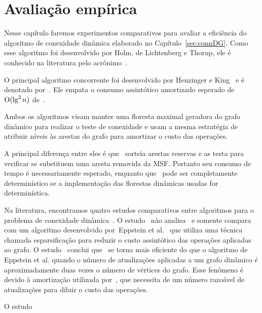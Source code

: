 \chapter{Avaliação empírica}
\label{sec:avaliacao-empirica}

Nesse capítulo faremos experimentos comparativos para avaliar a eficiência do algoritmo de conexidade dinâmica elaborado no Capítulo~\ref{sec:connDG}. Como esse algoritmo foi desenvolvido  por Holm, de Lichtenberg e Thorup, ele é conhecido na literatura pelo acrônimo~\HDT.

O principal algoritmo concorrente foi desenvolvido por Henzinger e King~\cite{HenzingerKing} e é denotado por~\HK.
Ele empata o consumo assintótico amortizado esperado de $\mathrm{O}(\lg^2 n)$ de~\HDT.

Ambos os algoritmos visam manter uma floresta maximal geradora do grafo dinâmico para realizar o teste de conexidade e usam a mesma estratégia de atribuir níveis às arestas do grafo para amortizar o custo das operações.

A principal diferença entre eles é que~\HK{} sorteia arestas reservas e as testa para verificar se substituem uma aresta removida da MSF. Portanto seu consumo de tempo é necessariamente esperado, enquanto que~\HDT{} pode ser completamente determinístico se a implementação das florestas dinâmicas usadas for determinística. 

Na literatura, encontramos quatro estudos comparativos entre algoritmos para o problema de conexidade dinâmica~\cite{EmpiricalStudy1997, EmpiricalStudy2002, Zaroliagis2002, QC22}.
O estudo~\cite{EmpiricalStudy1997} não analisa~\HDT{} e somente compara~\HK{} com um algoritmo desenvolvido por~Eppstein et al.~\cite{Eppstein1992SparsificationaTF} que utiliza uma técnica chamada esparsificação para reduzir o custo assintótico das operações aplicadas ao grafo.
O estudo~\cite{EmpiricalStudy1997} conclui que~\HK{} se torna mais eficiente do que o algoritmo de Eppstein et al. quando o número de atualizações aplicadas a um grafo dinâmico é aproximadamente duas vezes o número de vértices do grafo. Esse fenômeno é devido à amortização utilizada por~\HK{}, que necessita de um número razoável de atualizações para diluir o custo das operações. 



O estudo~\cite{EmpiricalStudy2002}


